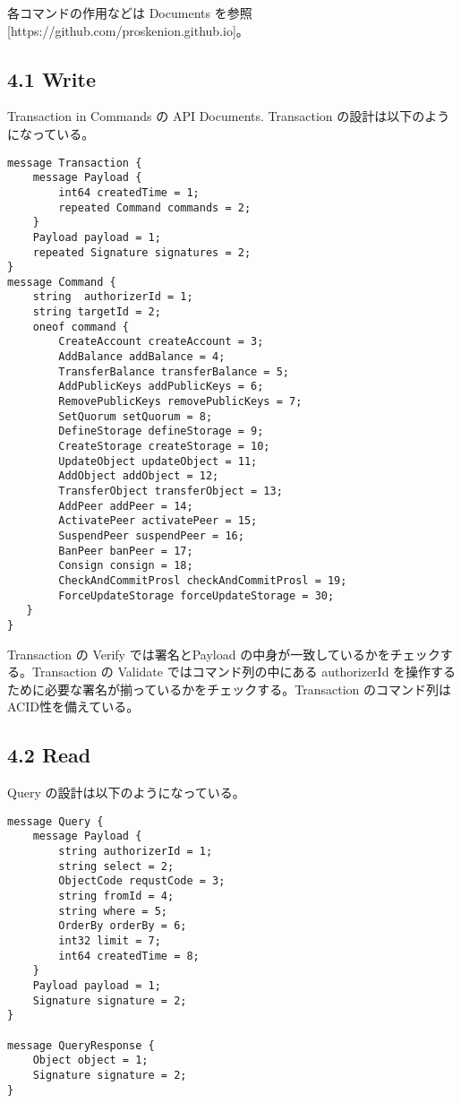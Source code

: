各コマンドの作用などは Documents
を参照{[}https://github.com/proskenion.github.io{]}。

\hypertarget{write}{%
\subsection{4.1 Write}\label{write}}

Transaction in Commands の API Documents. Transaction
の設計は以下のようになっている。

\begin{verbatim}
message Transaction {
    message Payload {
        int64 createdTime = 1;
        repeated Command commands = 2;
    }
    Payload payload = 1;
    repeated Signature signatures = 2;
}
message Command {
    string  authorizerId = 1;
    string targetId = 2;
    oneof command {
        CreateAccount createAccount = 3;
        AddBalance addBalance = 4;
        TransferBalance transferBalance = 5;
        AddPublicKeys addPublicKeys = 6;
        RemovePublicKeys removePublicKeys = 7;
        SetQuorum setQuorum = 8;
        DefineStorage defineStorage = 9;
        CreateStorage createStorage = 10;
        UpdateObject updateObject = 11;
        AddObject addObject = 12;
        TransferObject transferObject = 13;
        AddPeer addPeer = 14;
        ActivatePeer activatePeer = 15;
        SuspendPeer suspendPeer = 16;
        BanPeer banPeer = 17;
        Consign consign = 18;
        CheckAndCommitProsl checkAndCommitProsl = 19;
        ForceUpdateStorage forceUpdateStorage = 30;
   }
}
\end{verbatim}

Transaction の Verify では署名とPayload
の中身が一致しているかをチェックする。Transaction の Validate
ではコマンド列の中にある authorizerId
を操作するために必要な署名が揃っているかをチェックする。Transaction
のコマンド列はACID性を備えている。

\hypertarget{read}{%
\subsection{4.2 Read}\label{read}}

Query の設計は以下のようになっている。

\begin{verbatim}
message Query {
    message Payload {
        string authorizerId = 1;
        string select = 2;
        ObjectCode requstCode = 3;
        string fromId = 4;
        string where = 5;
        OrderBy orderBy = 6;
        int32 limit = 7;
        int64 createdTime = 8;
    }
    Payload payload = 1;
    Signature signature = 2;
}

message QueryResponse {
    Object object = 1;
    Signature signature = 2;
}
\end{verbatim}

